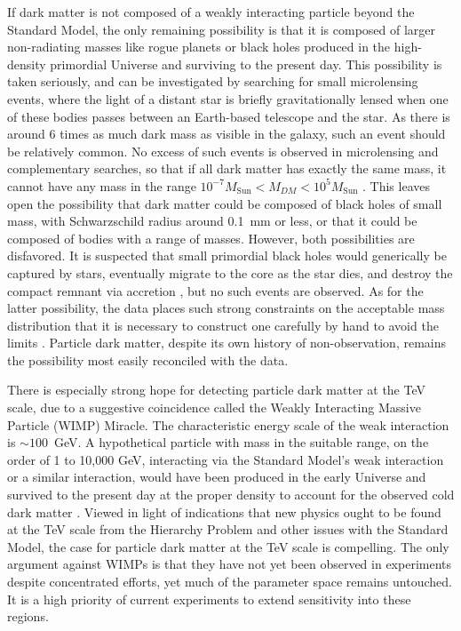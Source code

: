   If dark matter is not composed of a weakly interacting particle beyond the Standard Model, the only remaining possibility is that it is composed of larger non-radiating masses like rogue planets or black holes produced in the high-density primordial Universe and surviving to the present day.
  This possibility is taken seriously, and can be investigated by searching for small microlensing events, where the light of a distant star is briefly gravitationally lensed when one of these bodies passes between an Earth-based telescope and the star.
  As there is around 6 times as much dark mass as visible in the galaxy, such an event should be relatively common.
  No excess of such events is observed in microlensing and complementary searches, so that if all dark matter has exactly the same mass, it cannot have any mass in the range $10^{-7}M_{\mathrm{Sun}} < M_{DM} < 10^5 M_{\mathrm{Sun}}$ \cite{primordialBH_dist}.
  This leaves open the possibility that dark matter could be composed of black holes of small mass, with Schwarzschild radius around 0.1~mm or less, or that it could be composed of bodies with a range of masses.
  However, both possibilities are disfavored.
  It is suspected that small primordial black holes would generically be captured by stars, eventually migrate to the core as the star dies, and destroy the compact remnant via accretion \cite{primordialBH}, but no such events are observed.
  As for the latter possibility, the data places such strong constraints on the acceptable mass distribution that it is necessary to construct one carefully by hand to avoid the limits \cite{primordialBH_dist}.
  Particle dark matter, despite its own history of non-observation, remains the possibility most easily reconciled with the data.

  There is especially strong hope for detecting particle dark matter at the TeV scale, due to a suggestive coincidence called the Weakly Interacting Massive Particle (WIMP) Miracle.
  The characteristic energy scale of the weak interaction is $\sim100$~GeV.
  A hypothetical particle with mass in the suitable range, on the order of 1 to 10,000 GeV, interacting via the Standard Model's weak interaction or a similar interaction, would have been produced in the early Universe and survived to the present day at the proper density to account for the observed cold dark matter \cite{WIMPmiracle}.
  Viewed in light of indications that new physics ought to be found at the TeV scale from the Hierarchy Problem and other issues with the Standard Model, the case for particle dark matter at the TeV scale is compelling.
  The only argument against WIMPs is that they have not yet been observed in experiments despite concentrated efforts, yet much of the parameter space remains untouched.
  It is a high priority of current experiments to extend sensitivity into these regions.

